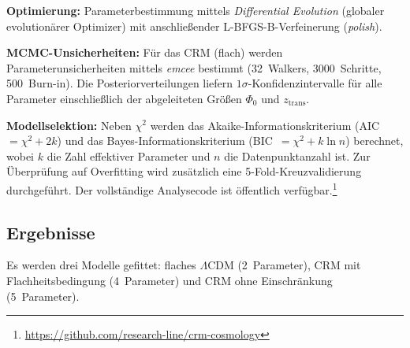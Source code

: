\documentclass[aps,prd,twocolumn,superscriptaddress,nofootinbib]{revtex4-2}
\begin{document}
\textbf{Optimierung:} Parameterbestimmung mittels \textit{Differential Evolution} (globaler evolution\"arer Optimizer) mit anschlie\ss{}ender L-BFGS-B-Verfeinerung (\textit{polish}).

\textbf{MCMC-Unsicherheiten:} F\"ur das CRM (flach) werden Parameterunsicherheiten mittels \textit{emcee} \cite{ForemanMackey2013} bestimmt (32~Walkers, 3000~Schritte, 500~Burn-in). Die Posteriorverteilungen liefern $1\sigma$-Konfidenzintervalle f\"ur alle Parameter einschlie\ss{}lich der abgeleiteten Gr\"o\ss{}en $\Phi_0$ und $z_{\mathrm{trans}}$.

\textbf{Modellselektion:} Neben $\chi^2$ werden das Akaike-Informationskriterium (AIC~$= \chi^2 + 2k$) und das Bayes-Informationskriterium (BIC~$= \chi^2 + k \ln n$) berechnet, wobei $k$ die Zahl effektiver Parameter und $n$ die Datenpunktanzahl ist. Zur \"Uberpr\"ufung auf Overfitting wird zus\"atzlich eine 5-Fold-Kreuzvalidierung durchgef\"uhrt. Der vollst\"andige Analysecode ist \"offentlich verf\"ugbar.\footnote{\url{https://github.com/research-line/crm-cosmology}}

\subsection{Ergebnisse}
\label{subsec:ergebnisse}

Es werden drei Modelle gefittet: flaches $\Lambda$CDM (2~Parameter), CRM mit Flachheitsbedingung (4~Parameter) und CRM ohne Einschr\"ankung (5~Parameter).
\end{document}

